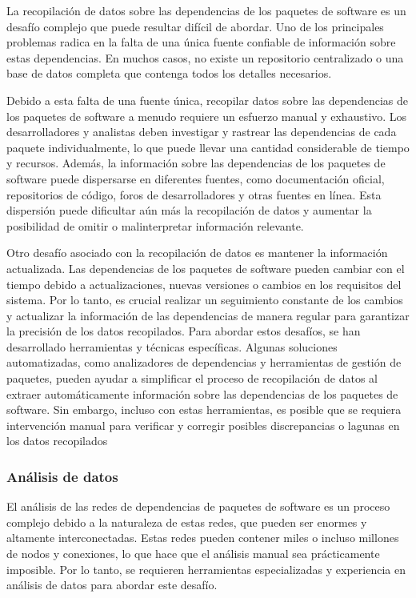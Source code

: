 La recopilación de datos sobre las dependencias de los paquetes de software es un desafío complejo que puede resultar difícil de abordar. 
Uno de los principales problemas radica en la falta de una única fuente confiable de información sobre estas dependencias. En muchos casos, no existe un repositorio centralizado o una base de datos completa que contenga todos los detalles necesarios.

Debido a esta falta de una fuente única, recopilar datos sobre las dependencias de los paquetes de software a menudo requiere un esfuerzo manual y exhaustivo. Los desarrolladores y analistas deben investigar y rastrear las dependencias de cada paquete individualmente, lo que puede llevar una cantidad considerable de tiempo y recursos.
Además, la información sobre las dependencias de los paquetes de software puede dispersarse en diferentes fuentes, como documentación oficial, repositorios de código, foros de desarrolladores y otras fuentes en línea. Esta dispersión puede dificultar aún más la recopilación de datos y aumentar la posibilidad de omitir o malinterpretar información relevante.

Otro desafío asociado con la recopilación de datos es mantener la información actualizada. Las dependencias de los paquetes de software pueden cambiar con el tiempo debido a actualizaciones, nuevas versiones o cambios en los requisitos del sistema. Por lo tanto, es crucial realizar un seguimiento constante de los cambios y actualizar la información de las dependencias de manera regular para garantizar la precisión de los datos recopilados.
Para abordar estos desafíos, se han desarrollado herramientas y técnicas específicas. Algunas soluciones automatizadas, como analizadores de dependencias y herramientas de gestión de paquetes, pueden ayudar a simplificar el proceso de recopilación de datos al extraer automáticamente información sobre las dependencias de los paquetes de software. Sin embargo, incluso con estas herramientas, es posible que se requiera intervención manual para verificar y corregir posibles discrepancias o lagunas en los datos recopilados

\subsubsection{Análisis de datos}

El análisis de las redes de dependencias de paquetes de software es un proceso complejo debido a la naturaleza de estas redes, que pueden ser enormes y altamente interconectadas. Estas redes pueden contener miles o incluso millones de nodos y conexiones, lo que hace que el análisis manual sea prácticamente imposible. Por lo tanto, se requieren herramientas especializadas y experiencia en análisis de datos para abordar este desafío.

